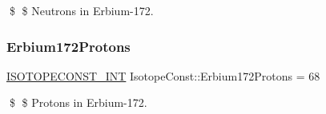 \$ \$ Neutrons in Erbium-\/172. \mbox{\label{group___isotope_const-_erbium-_er172_gaacfc3916952e7ed8cdb6d147c2e807fa}} 
\subsubsection{\texorpdfstring{Erbium172\+Protons}{Erbium172Protons}}
{\footnotesize\ttfamily \mbox{\hyperlink{group___isotope_const-_macros_ga5f18360b3e99483a35c32d789e62621c}{I\+S\+O\+T\+O\+P\+E\+C\+O\+N\+S\+T\+\_\+\+I\+NT}} Isotope\+Const\+::\+Erbium172\+Protons = 68}

\$ \$ Protons in Erbium-\/172. 